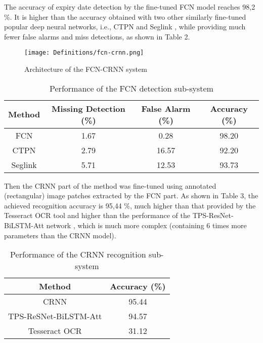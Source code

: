 \documentclass[journal,article,accept,moreauthors,pdftex]{Definitions/mdpi}
\begin{document}
The accuracy of expiry date  detection by the fine-tuned FCN model reaches 98,2 \%. It is higher than the accuracy obtained with two other similarly fine-tuned popular deep neural networks, i.e., CTPN \cite{ref36} and Seglink \cite{ref37}, while providing much fewer false alarms and miss detections, as shown in Table 2. 

\begin{figure*}[tph!]
\texttt{[image: Definitions/fcn-crnn.png]}
\centering
\caption{Architecture of the FCN-CRNN system}
\label{fcn-rnn}
\end{figure*}

\begin{table}[tph!]
\caption{Performance of the FCN detection sub-system }
\label{table:fcn}
\centering
\begin{tabular}{|c|c|c|c|}
\hline 
Method & Missing Detection (\%) & False Alarm (\%) & Accuracy (\%) \\
\hline \hline
FCN & 1.67 & 0.28 & 98.20\\
CTPN \cite{ref36} & 2.79 & 16.57 & 92.20\\
Seglink \cite{ref37} & 5.71 & 12.53 & 93.73\\
\hline 
\end{tabular}
\end{table}

Then the CRNN part of the method was fine-tuned using annotated (rectangular) image patches extracted by the FCN part.  As shown in Table 3, the achieved recognition accuracy is 95,44 \%, much higher than that provided by the Tesseract OCR tool \cite{ref39} and higher than the performance of the TPS-ResNet-BiLSTM-Att network \cite{ref38}, which is much more complex (containing 6 times more parameters than the CRNN model).



\begin{table}[tph!]
\caption{Performance of the CRNN recognition sub-system }
\label{table:crnn}
\centering
\begin{tabular}{|c|c|}
\hline 
Method & Accuracy (\%) \\
\hline \hline
CRNN  & 95.44\\
TPS-ReSNet-BiLSTM-Att \cite{ref38} & 94.57\\
Tesseract OCR \cite{ref39} &  31.12\\
\hline 
\end{tabular}
\end{table}
\end{document}
